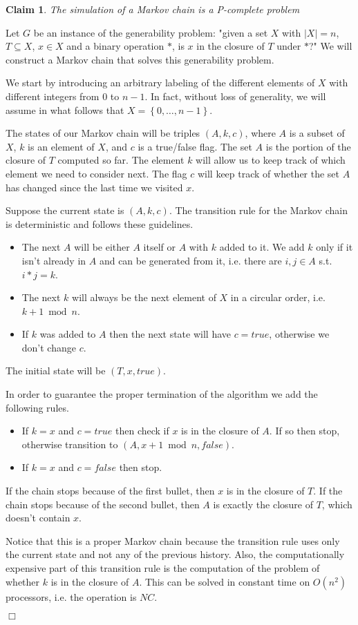 \documentclass[11pt,letterpaper]{article}       %
\newtheorem{claim}{Claim}
\newenvironment{proof}           {\noindent{\bf Proof.} }%
                                 {\null\hfill$\Box$\par\medskip}
\begin{document}
\begin{claim}
The simulation of a Markov chain is a P-complete problem
\end{claim}
\begin{proof} 
Let $G$ be an instance of the generability problem:
	"given a set $X$ with $|X|=n$, 
	$T\subseteq X$, $x\in X$ and a binary operation $*$, 
	is $x$ in the closure of $T$ under $*$?"
We will construct a Markov chain that solves this generability problem.

We start by introducing an arbitrary labeling of the different elements of $X$
with different integers from $0$ to $n-1$.  In fact, without loss of
generality, we will assume in what follows that $X=\left\{0, \ldots,
n-1\right\}$. 

The states of our Markov chain will be triples $(A,k,c)$, where $A$ is a subset
of $X$, $k$ is an element of $X$, and $c$ is a true/false flag.  The set $A$
is the portion of the closure of $T$ computed so far.  The element $k$ will
allow us to keep track of which element we need to consider next.  The flag $c$
will keep track of whether the set $A$ has changed since the last time we
visited $x$.

Suppose the current state is $(A, k, c)$.  The transition rule for the Markov chain is deterministic
and follows these guidelines.
\begin{itemize}
\item The next $A$ will be either $A$ itself or $A$ with $k$ added to it.  We
add $k$ only if it isn't already in $A$ and can be generated from it, i.e.
there are $i,j\in A$ s.t. $i*j=k$.
\item The next $k$ will always be the next element of $X$ in a circular order,
i.e. $k+1\bmod n$.  
\item If $k$ was added to $A$ then the next state will have $c=true$, otherwise
we don't change $c$.  
\end{itemize}

The initial state will be $(T, x, true)$.

In order to guarantee the proper termination of the algorithm we add the
following rules.
\begin{itemize}
\item If $k=x$ and $c=true$ then check if $x$ is in the closure of $A$.  If so
then stop, otherwise transition to $(A, x+1\bmod n, false)$.
\item If $k=x$ and $c=false$ then stop.
\end{itemize}
If the chain stops because of the first bullet, then $x$ is in the closure of
$T$.  If the chain stops because of the second bullet, then $A$ is exactly the
closure of $T$, which doesn't contain $x$.

Notice that this is a proper Markov chain because the transition rule uses only
the current state and not any of the previous history.  Also, the computationally 
expensive part of this transition rule is the 
computation of the problem of whether $k$ is in the closure of $A$.  This can be
solved in constant time on $O(n^2)$ processors, i.e.  the operation is $NC$.

\end{proof}
\end{document}
